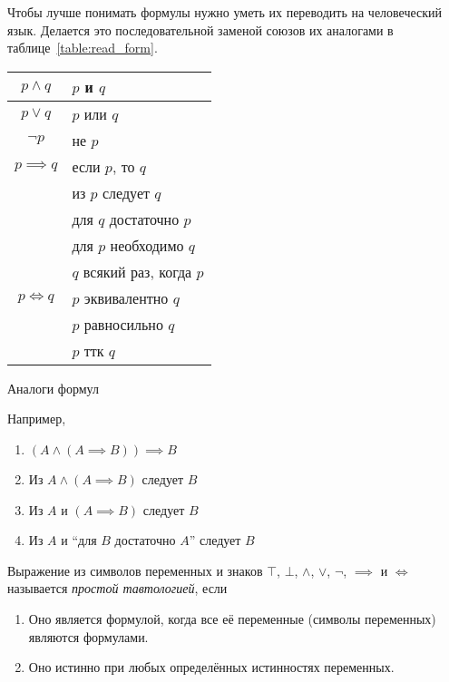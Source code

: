 Чтобы лучше понимать формулы нужно уметь их переводить на человеческий язык. Делается
это последовательной заменой союзов их аналогами в таблице~\ref{table:read_form}.
\begin{margintable}
	\begin{tabular}{cl}
		$p\land q$    & $p$ и $q$                 \\\hline
		$p\lor q$     & $p$ или $q$               \\\hline
		$\lnot p$     & не $p$                    \\\hline
		$p\implies q$ & если $p$, то $q$          \\
		              & из $p$ следует $q$        \\
		              & для $q$ достаточно $p$    \\
		              & для $p$ необходимо $q$    \\
		              & $q$ всякий раз, когда $p$ \\\hline
		$p\iff q$     & $p$ эквивалентно $q$      \\
		              & $p$ равносильно $q$       \\
		              & $p$ ттк $q$
	\end{tabular}
	\caption{Аналоги формул}\label{table:read_form}
\end{margintable}

Например,
\begin{enumerate}
	\item{}$(A\land (A\implies B))\implies B$
	\item{}Из $A\land (A\implies B)$ следует $B$
	\item{}Из $A$ и $(A\implies B)$ следует $B$
	\item{}Из $A$ и ``для $B$ достаточно $A$'' следует $B$
\end{enumerate}

\pagebreak

Выражение из символов переменных и знаков $\top$, $\bot$, $\land$, $\lor$, $\lnot$,
$\implies$ и $\iff$ называется {\it простой тавтологией}, если
\begin{multicols}{2}
	\begin{enumerate}
		\item{}Оно является формулой, когда все её переменные (символы переменных)
		являются формулами.
		\columnbreak
		\item{}Оно истинно при любых определённых истинностях переменных.
	\end{enumerate}
\end{multicols}


